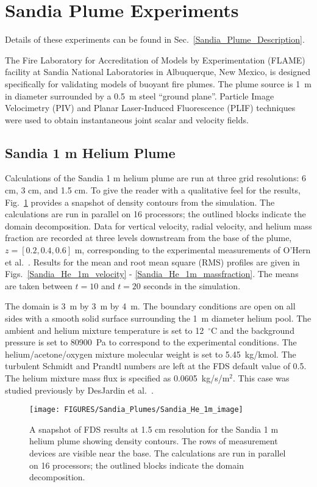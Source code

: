 \clearpage

\section{Sandia Plume Experiments}

Details of these experiments can be found in Sec.~\ref{Sandia_Plume_Description}.

The Fire Laboratory for Accreditation of Models by Experimentation (FLAME) facility \cite{OHern:2005,Blanchat:2001} at Sandia National Laboratories in Albuquerque, New Mexico, is designed specifically for validating models of buoyant fire plumes.  The plume source is 1~m in diameter surrounded by a 0.5~m steel ``ground plane''. Particle Image Velocimetry (PIV) and Planar Laser-Induced Fluorescence (PLIF) techniques were used to obtain instantaneous joint scalar and velocity fields.

\subsection{Sandia 1 m Helium Plume}
\label{Sandia plume}

Calculations of the Sandia 1 m helium plume are run at three grid resolutions: 6 cm, 3 cm, and 1.5 cm.  To give the reader with a qualitative feel for the results, Fig.~\ref{Sandia_He_1m_image} provides a snapshot of density contours from the simulation. The calculations are run in parallel on 16 processors; the outlined blocks indicate the domain decomposition.  Data for vertical velocity, radial velocity, and helium mass fraction are recorded at three levels downstream from the base of the plume, $z = [0.2, 0.4, 0.6]$ m, corresponding to the experimental measurements of O'Hern et al.~\cite{OHern:2005}.  Results for the mean and root mean square (RMS) profiles are given in Figs.~\ref{Sandia_He_1m_velocity} - \ref{Sandia_He_1m_massfraction}.  The means are taken between $t=10$ and $t=20$ seconds in the simulation.

The domain is 3~m by 3~m by 4~m. The boundary conditions are open on all sides with a smooth solid surface surrounding the 1~m diameter helium pool.  The ambient and helium mixture temperature is set to 12~$^\circ$C and the background pressure is set to 80900~Pa to correspond to the experimental conditions.  The helium/acetone/oxygen mixture molecular weight is set to 5.45~kg/kmol.  The turbulent Schmidt and Prandtl numbers are left at the FDS default value of 0.5.  The helium mixture mass flux is specified as 0.0605~kg/s/m$^2$. This case was studied previously by DesJardin et al.~\cite{DesJardin:2004}.
\begin{figure}[h]
\begin{center}
\texttt{[image: FIGURES/Sandia\_Plumes/Sandia\_He\_1m\_image]}
\caption[Sandia 1~m helium plume image]{A snapshot of FDS results at 1.5 cm resolution for the Sandia 1 m helium plume showing density contours.  The rows of measurement devices are visible near the base. The calculations are run in parallel on 16 processors; the outlined blocks indicate the domain decomposition.}
\label{Sandia_He_1m_image}
\end{center}
\end{figure}

